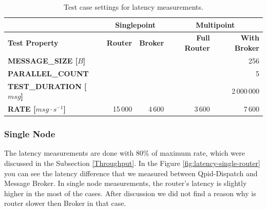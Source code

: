 \begingroup
\setlength{\tabcolsep}{10pt} %
\renewcommand{\arraystretch}{1.35} %
	\begin{table}[H]
	\centering
	\caption{Test case settings for latency measurements.}
	\label{tab:test_case_latency}
	\begin{tabular}{|l|r|r|r|r|}
	\hline
	\rowcolor[HTML]{C5E3DF}
	 & \multicolumn{2}{c|}{\textbf{Singlepoint}} & \multicolumn{2}{c|}{\textbf{Multipoint}} \\ \hline
	\rowcolor[HTML]{C5E3DF}
	\textbf{Test Property} & \textbf{Router} & \textbf{Broker} & \textbf{Full Router} & \textbf{With Broker} \\ \hline
	\textbf{MESSAGE\_SIZE [$B$]} & \multicolumn{4}{r|}{256} \\ \hline
	\textbf{PARALLEL\_COUNT} & \multicolumn{4}{r|}{5} \\ \hline
	\textbf{TEST\_DURATION [$msg$]} & \multicolumn{4}{r|}{2\,000\,000} \\ \hline
	\textbf{RATE [$msg \cdot s^{-1}$]} & 15\,000 & 4\,600 & 3\,600 & 7\,600 \\ \hline
	\end{tabular}
	\end{table}
\endgroup

\subsubsection*{Single Node}
The latency measurements are done with 80\% of maximum rate, which were discussed in the Subsection \ref{Throughput}. In the Figure \ref{fig:latency-single-router} you can see the latency difference that we measured between Qpid-Dispatch and Message Broker. In single node measurements, the router's latency is slightly higher in the most of the cases. After discussion we did not find a reason why is router slower then Broker in that case.


